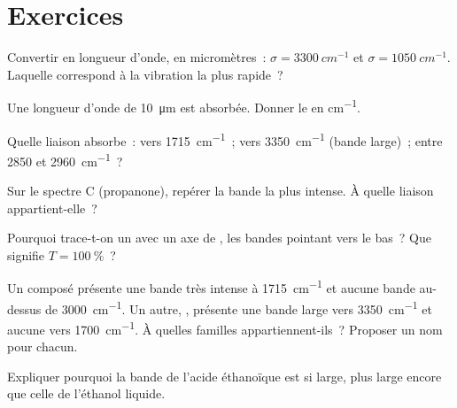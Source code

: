 \section{Exercices}

\begin{exercise}[$\star$]\label{exo:g11:infrared:1}
Convertir en longueur d'onde, en micromètres~: $\sigma = \qty{3300}{cm^{-1}}$
et $\sigma = \qty{1050}{cm^{-1}}$. Laquelle correspond à la vibration la
plus rapide~?
\end{exercise}

\begin{exercise}[$\star$]\label{exo:g11:infrared:2}
Une longueur d'onde de \qty{10}{\micro m} est absorbée. Donner le  en \si{cm^{-1}}.
\end{exercise}

\begin{exercise}[$\star$]\label{exo:g11:infrared:3}
Quelle liaison absorbe~: vers \qty{1715}{cm^{-1}}~; vers
\qty{3350}{cm^{-1}} (bande large)~; entre 2850 et \qty{2960}{cm^{-1}}~?
\end{exercise}

\begin{exercise}[$\star$]\label{exo:g11:infrared:4}
Sur le spectre C (propanone), repérer la bande la plus intense. À quelle
liaison appartient-elle~?
\end{exercise}

\begin{exercise}[$\star$]\label{exo:g11:infrared:5}
Pourquoi trace-t-on un  avec un axe de ,
les bandes pointant vers le bas~? Que signifie $T = \qty{100}{\percent}$~?
\end{exercise}

\begin{exercise}[$\star\star$]\label{exo:g11:infrared:6}
Un composé  présente une bande très intense à
\qty{1715}{cm^{-1}} et aucune bande au-dessus de \qty{3000}{cm^{-1}}. Un
autre, , présente une bande large vers \qty{3350}{cm^{-1}} et
aucune vers \qty{1700}{cm^{-1}}. À quelles familles appartiennent-ils~?
Proposer un nom pour chacun.
\end{exercise}

\begin{exercise}[$\star\star$]\label{exo:g11:infrared:7}
Expliquer pourquoi la bande  de l'acide éthanoïque est si large,
plus large encore que celle de l'éthanol liquide.
\end{exercise}

